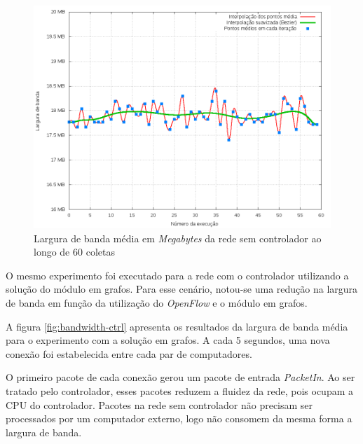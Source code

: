 \begin{figure}[!htb]
    \centering
    \label{fig:bandwidth-no-ctrl}
    \includegraphics[width=\linewidth]{img/bandwidth-no-ctrl}
    \caption{Largura de banda média em \emph{Megabytes} da rede sem 
    controlador ao longo de 60 coletas}
\end{figure}

O mesmo experimento foi executado para a rede com o controlador utilizando 
a solução do módulo em grafos.
Para esse cenário, notou-se uma redução na largura de banda em função da 
utilização do \emph{OpenFlow} e o módulo em grafos.

A figura \ref{fig:bandwidth-ctrl} apresenta os resultados da largura de banda
média para o experimento com a solução em grafos.
A cada 5 segundos, uma nova conexão foi estabelecida entre cada par de 
computadores.

O primeiro pacote de cada conexão gerou um pacote de entrada \emph{PacketIn}.
Ao ser tratado pelo controlador, esses pacotes reduzem a fluidez da rede, pois
ocupam a CPU do controlador.
Pacotes na rede sem controlador não precisam ser processados por um computador
externo, logo não consomem da mesma forma a largura de banda.

\break

